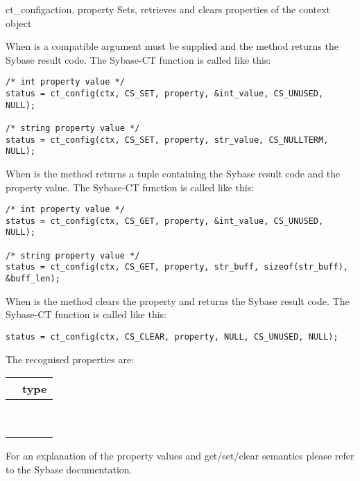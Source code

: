 \begin{methoddesc}[CS_CONTEXT]{ct_config}{action, property }
Sets, retrieves and clears properties of the context object

When  is  a compatible  argument
must be supplied and the method returns the Sybase result code.  The
Sybase-CT  function is called like this:

\begin{verbatim}
/* int property value */
status = ct_config(ctx, CS_SET, property, &int_value, CS_UNUSED, NULL);

/* string property value */
status = ct_config(ctx, CS_SET, property, str_value, CS_NULLTERM, NULL);
\end{verbatim}

When  is  the method returns a tuple
containing the Sybase result code and the property value.  The
Sybase-CT  function is called like this:

\begin{verbatim}
/* int property value */
status = ct_config(ctx, CS_GET, property, &int_value, CS_UNUSED, NULL);

/* string property value */
status = ct_config(ctx, CS_GET, property, str_buff, sizeof(str_buff), &buff_len);
\end{verbatim}

When  is  the method clears the property
and returns the Sybase result code.  The Sybase-CT
 function is called like this:

\begin{verbatim}
status = ct_config(ctx, CS_CLEAR, property, NULL, CS_UNUSED, NULL);
\end{verbatim}

The recognised properties are:

\begin{longtable}{l|l}
\var{property} & type \\
\hline
\code{CS_LOGIN_TIMEOUT} & \code{int} \\
\code{CS_MAX_CONNECT}   & \code{int} \\
\code{CS_NETIO}         & \code{int} \\
\code{CS_NO_TRUNCATE}   & \code{int} \\
\code{CS_TEXTLIMIT}     & \code{int} \\
\code{CS_TIMEOUT}       & \code{int} \\
\code{CS_VERSION}       & \code{int} \\
\code{CS_IFILE}         & \code{string} \\
\code{CS_VER_STRING}    & \code{string} \\
\end{longtable}

For an explanation of the property values and get/set/clear semantics
please refer to the Sybase documentation.
\end{methoddesc}

